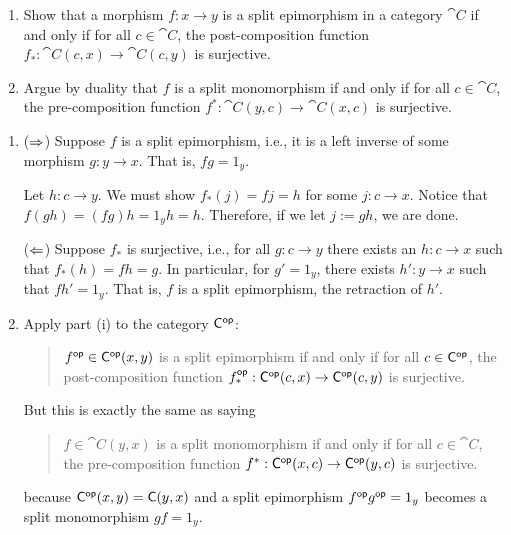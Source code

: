 \documentclass[notes,tikz]{agony}
\newcommand{\inenum}{\vspace{-1.8em}}
\begin{document}
\begin{xca}
  \leavevmode
  \begin{enumerate}
    \item Show that a morphism $f : x \to y$ is a split epimorphism
          in a category $\cat C$ if and only if for all $c \in \cat C$,
          the post-composition function $f_* : \cat C(c,x) \to \cat C(c,y)$ is surjective.
    \item Argue by duality that $f$ is a split monomorphism if and only if
          for all $c \in \cat C$, the pre-composition function
          $f^* : \cat C(y,c) \to \cat C(x,c)$ is surjective.
  \end{enumerate}
\end{xca}
\begin{enumerate}
  \item \begin{prf}\inenum
          ($\Rightarrow$) Suppose $f$ is a split epimorphism, i.e.,
          it is a left inverse of some morphism $g : y \to x$.
          That is, $fg = 1_y$.

          Let $h : c \to y$.
          We must show $f_*(j) = fj = h$ for some $j : c \to x$.
          Notice that $f(gh) = (fg)h = 1_y h = h$.
          Therefore, if we let $j := gh$, we are done.

          ($\Leftarrow$) Suppose $f_*$ is surjective, i.e.,
          for all $g : c \to y$ there exists an $h : c \to x$
          such that $f_*(h) = fh = g$.
          In particular, for $g' = 1_y$, there exists $h' : y \to x$
          such that $fh' = 1_y$.
          That is, $f$ is a split epimorphism, the retraction of $h'$.
        \end{prf}
  \item \begin{prf}\inenum
          Apply part (i) to the category $\mathsf{C}^{\mathsf{op}}$:
          \begin{quote}
            $f^{\mathsf{op}} \in \mathsf{C}^{\mathsf{op}}(x,y)$ is a split epimorphism
            if and only if for all $c \in \mathsf{C}^{\mathsf{op}}$,
            the post-composition function $f_*^{\mathsf{op}} : \mathsf{C}^{\mathsf{op}}(c,x) \to \mathsf{C}^{\mathsf{op}}(c,y)$ is surjective.
          \end{quote}
          But this is exactly the same as saying
          \begin{quote}
            $f \in \cat C(y,x)$ is a split monomorphism
            if and only if for all $c \in \cat C$,
            the pre-composition function $f^* : \mathsf{C}^{\mathsf{op}}(x,c) \to \mathsf{C}^{\mathsf{op}}(y,c)$ is surjective.
          \end{quote}
          because $\mathsf{C}^{\mathsf{op}}(x,y) = \mathsf{C}(y,x)$
          and a split epimorphism $f^{\mathsf{op}} g^{\mathsf{op}} = 1_y$
          becomes a split monomorphism $gf = 1_y$.
        \end{prf}
\end{enumerate}
\end{document}
